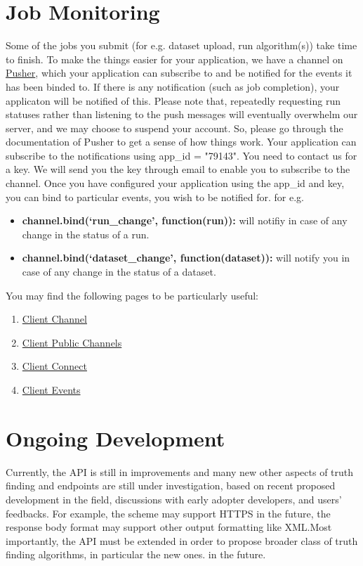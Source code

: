 \documentclass[a4paper,10pt]{scrartcl}
\begin{document}
\section{Job Monitoring}
Some of the jobs you submit (for e.g. dataset upload, run algorithm(s)) take time to finish. 
To make the things easier for your application, we have a channel on \href{https://pusher.com/}{Pusher},
which your application can subscribe to and be notified for the events it has been binded to. If there is any notification 
(such as job completion), your applicaton will be notified of this. Please note that, repeatedly requesting
run statuses rather than listening to the push messages will eventually overwhelm our server, and we may choose
to suspend your account. So, please go through the documentation of Pusher to get a sense of how things work. Your 
application can subscribe to the notifications using app\_id = "79143". You need to contact us for a key. We will send 
you the key through email to enable you to subscribe to the channel. Once you have configured your application using the 
app\_id and key, you can bind to particular events, you wish to be notified for. for e.g. 

\begin{itemize}
 \item \textbf{channel.bind(`run\_change', function(run){}):} will notifiy in case of any change in the status of a run.
 \item \textbf{channel.bind(`dataset\_change', function(dataset){}):} will notify you in case of any change in the status of a dataset. 
\end{itemize}
You may find the following pages to be particularly useful:
\begin{enumerate}
 \item \href{https://pusher.com/docs/client_api_guide/client_channels}{Client Channel}
 \item \href{https://pusher.com/docs/client_api_guide/client_public_channels}{Client Public Channels}
 \item \href{https://pusher.com/docs/client_api_guide/client_connect}{Client Connect}
 \item \href{https://pusher.com/docs/client_api_guide/client_events}{Client Events}
\end{enumerate}

\section{Ongoing Development}
Currently, the API is still in improvements and many new other aspects of truth finding and endpoints are still under investigation, based on recent
proposed development in the field, discussions with early adopter developers, and users' feedbacks. For example, the scheme may support HTTPS in the 
future, the response body format may support other output formatting like XML.Most importantly, the API must be extended in order to propose broader 
class of truth finding algorithms, in particular the new ones.
in the future.
\end{document}
